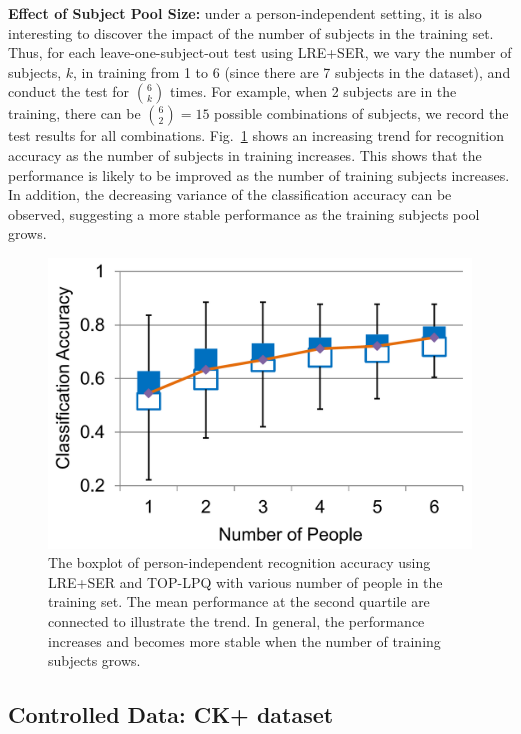 \documentclass[journal]{IEEEtran}
\begin{document}
\textbf{Effect of Subject Pool Size:} under a person-independent setting, it is also interesting to discover the impact of the number of subjects in the training set. Thus, for each leave-one-subject-out test using LRE+SER, we vary the number of subjects, $k$, in training from 1 to 6 (since there are 7 subjects in the dataset), and conduct the test for ${6 \choose k}$ times. For example, when 2 subjects are in the training, there can be ${6 \choose 2}=15$ possible combinations of subjects, we record the test results for all combinations. Fig.~\ref{fig:effect_people_num} shows an increasing trend for recognition accuracy as the number of subjects in training increases. This shows that the performance is likely to be improved as the number of training subjects increases. In addition, the decreasing variance of the classification accuracy can be observed, suggesting a more stable performance as the training subjects pool grows. 


\begin{figure}[htbp]
	\centering
		\includegraphics[width=.75\columnwidth]{pics/effect_people_num.png}
	\caption{The boxplot of person-independent recognition accuracy using LRE+SER and TOP-LPQ with various number of people in the training set. The mean performance at the second quartile are connected to illustrate the trend. In general, the performance increases and becomes more stable when the number of training subjects grows.}
	\label{fig:effect_people_num}
\end{figure}


\subsection{Controlled Data: CK+ dataset}
\end{document}
